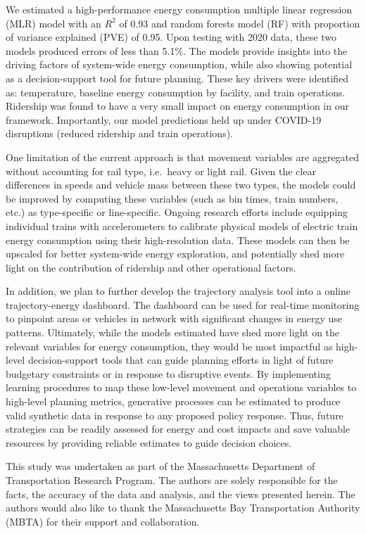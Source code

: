 \documentclass[times]{TRR}
\begin{document}
We estimated a high-performance energy consumption multiple linear regression (MLR) model with an $R^2$ of 0.93 and random forests model (RF) with proportion of variance explained (PVE) of 0.95. Upon testing with 2020 data, these two models produced errors of less than 5.1\%. The models provide insights into the driving factors of system-wide energy consumption, while also showing potential as a decision-support tool for future planning. These key drivers were identified as: temperature, baseline energy consumption by facility, and train operations. Ridership was found to have a very small impact on energy consumption in our framework. Importantly, our model predictions held up under COVID-19 disruptions (reduced ridership and train operations).


One limitation of the current approach is that movement variables are aggregated without accounting for rail type, i.e.\ heavy or light rail. Given the clear differences in speeds and vehicle mass between these two types, the models could be improved by computing these variables (such as bin times, train numbers, etc.) as type-specific or line-specific.  Ongoing research efforts include equipping individual trains with accelerometers to calibrate physical models of electric train energy consumption using their high-resolution data. These models can then be upscaled for better system-wide energy exploration, and potentially shed more light on the contribution of ridership and other operational factors.

In addition, we plan to further develop the trajectory analysis tool into a online trajectory-energy dashboard. The dashboard can be used for real-time monitoring to pinpoint areas or vehicles in network with significant changes in energy use patterns.
Ultimately, while the models estimated have shed more light on the relevant variables for energy consumption, they would be most impactful as high-level decision-support tools that can guide planning efforts in light of future budgetary constraints or in response to disruptive events. By implementing learning procedures to map these low-level movement and operations variables to high-level planning metrics, generative processes can be estimated to produce valid synthetic data in response to any proposed policy response. Thus, future strategies can be readily assessed for energy and cost impacts and save valuable resources by providing reliable estimates to guide decision choices.

 
 
\begin{acks}
This study was undertaken as part of the Massachusetts Department of Transportation Research Program. The authors are solely responsible for the facts, the accuracy of the data and analysis, and the views presented herein. The authors would also like to thank the Massachusetts Bay Transportation Authority (MBTA) for their support and collaboration.
\end{acks}
\end{document}
